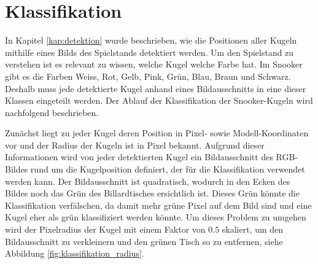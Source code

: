 \newpage
\section{Klassifikation}\label{kap:klassifikation}
In Kapitel \ref{kap:detektion} wurde beschrieben, wie die Positionen aller Kugeln mithilfe eines Bilds des Spielstands detektiert werden.
Um den Spielstand zu verstehen ist es relevant zu wissen, welche Kugel welche Farbe hat.
Im Snooker gibt es die Farben Weiss, Rot, Gelb, Pink, Grün, Blau, Braun und Schwarz.
Deshalb muss jede detektierte Kugel anhand eines Bildausschnitts in eine dieser Klassen eingeteilt werden.
Der Ablauf der Klassifikation der Snooker-Kugeln wird nachfolgend beschrieben.

Zunächst liegt zu jeder Kugel deren Position in Pixel- sowie Modell-Koordinaten vor und der Radius der Kugeln ist in Pixel bekannt\cite{project2:pixel_to_model_coordinates}.
Aufgrund dieser Informationen wird von jeder detektierten Kugel ein Bildausschnitt des RGB-Bildes rund um die Kugelposition definiert,
der für die Klassifikation verwendet werden kann.
Der Bildausschnitt ist quadratisch, wodurch in den Ecken des Bildes noch das Grün des Billardtisches ersichtlich ist.
Dieses Grün könnte die Klassifikation verfälschen, da damit mehr grüne Pixel auf dem Bild sind und eine Kugel eher als grün klassifiziert werden könnte.
Um dieses Problem zu umgehen wird der Pixelradius der Kugel mit einem Faktor von $0.5$ skaliert, um den Bildausschnitt zu verkleinern
und den grünen Tisch so zu entfernen, siehe Abbildung \ref{fig:klassifikation_radius}.

